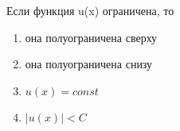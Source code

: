 Если функция u(x) ограничена, то

\begin{enumerate}[label=\arabic*)]
    \item она полуограничена сверху
    \item она полуограничена снизу
    \item \(u\left(x\right)=const\)
    \item \(\left\lvert u(x)\right\rvert < C\)
\end{enumerate}

